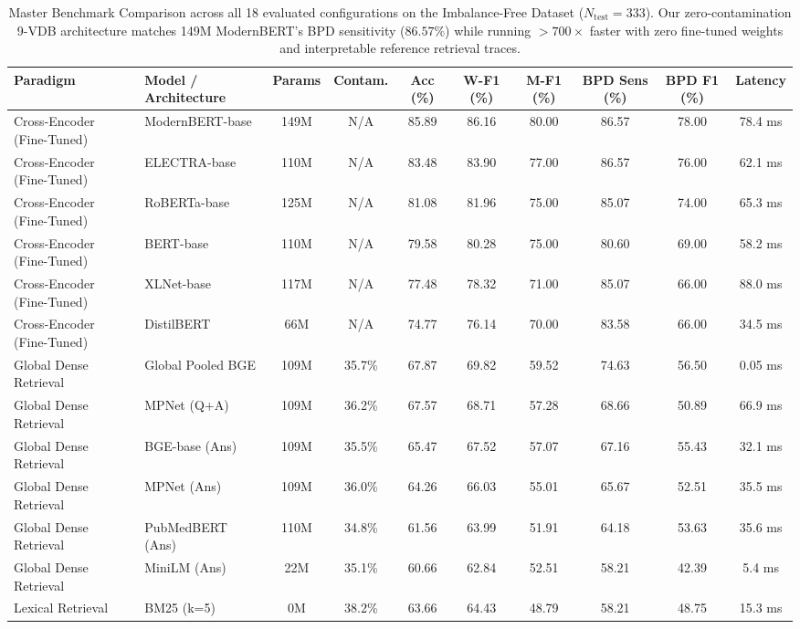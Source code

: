 \begin{table}[t]
\centering
\small
\caption{Master Benchmark Comparison across all 18 evaluated configurations on the Imbalance-Free Dataset ($N_{\text{test}}=333$). Our zero-contamination 9-VDB architecture matches 149M ModernBERT's BPD sensitivity ($86.57\%$) while running $>700\times$ faster with zero fine-tuned weights and interpretable reference retrieval traces.}
\label{tab:master_benchmark}
\begin{tabular}{llcccccccc}
\hline
\textbf{Paradigm} & \textbf{Model / Architecture} & \textbf{Params} & \textbf{Contam.} & \textbf{Acc (\%)} & \textbf{W-F1 (\%)} & \textbf{M-F1 (\%)} & \textbf{BPD Sens (\%)} & \textbf{BPD F1 (\%)} & \textbf{Latency} \\
\hline
Cross-Encoder (Fine-Tuned) & ModernBERT-base & 149M & N/A & 85.89 & 86.16 & 80.00 & 86.57 & 78.00 & 78.4 ms \\
Cross-Encoder (Fine-Tuned) & ELECTRA-base & 110M & N/A & 83.48 & 83.90 & 77.00 & 86.57 & 76.00 & 62.1 ms \\
Cross-Encoder (Fine-Tuned) & RoBERTa-base & 125M & N/A & 81.08 & 81.96 & 75.00 & 85.07 & 74.00 & 65.3 ms \\
Cross-Encoder (Fine-Tuned) & BERT-base & 110M & N/A & 79.58 & 80.28 & 75.00 & 80.60 & 69.00 & 58.2 ms \\
Cross-Encoder (Fine-Tuned) & XLNet-base & 117M & N/A & 77.48 & 78.32 & 71.00 & 85.07 & 66.00 & 88.0 ms \\
Cross-Encoder (Fine-Tuned) & DistilBERT & 66M & N/A & 74.77 & 76.14 & 70.00 & 83.58 & 66.00 & 34.5 ms \\
\hline
Global Dense Retrieval & Global Pooled BGE & 109M & 35.7\% & 67.87 & 69.82 & 59.52 & 74.63 & 56.50 & 0.05 ms \\
Global Dense Retrieval & MPNet (Q+A) & 109M & 36.2\% & 67.57 & 68.71 & 57.28 & 68.66 & 50.89 & 66.9 ms \\
Global Dense Retrieval & BGE-base (Ans) & 109M & 35.5\% & 65.47 & 67.52 & 57.07 & 67.16 & 55.43 & 32.1 ms \\
Global Dense Retrieval & MPNet (Ans) & 109M & 36.0\% & 64.26 & 66.03 & 55.01 & 65.67 & 52.51 & 35.5 ms \\
Global Dense Retrieval & PubMedBERT (Ans) & 110M & 34.8\% & 61.56 & 63.99 & 51.91 & 64.18 & 53.63 & 35.6 ms \\
Global Dense Retrieval & MiniLM (Ans) & 22M & 35.1\% & 60.66 & 62.84 & 52.51 & 58.21 & 42.39 & 5.4 ms \\
\hline
Lexical Retrieval & BM25 (k=5) & 0M & 38.2\% & 63.66 & 64.43 & 48.79 & 58.21 & 48.75 & 15.3 ms \\

\end{tabular}
\end{table}
